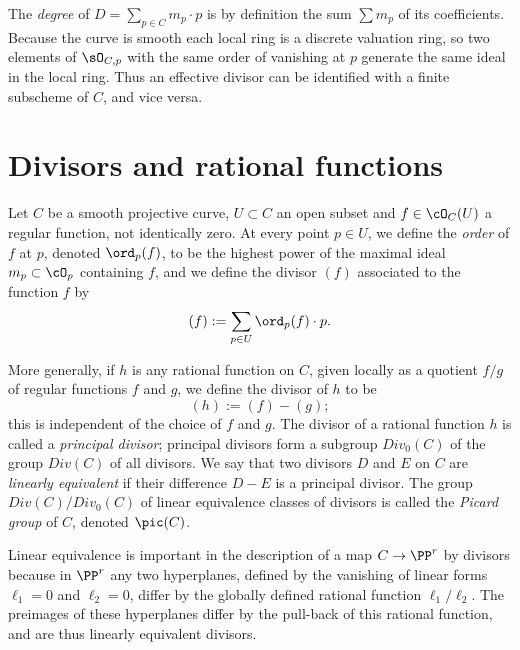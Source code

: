 
The \emph{degree} of  $D = \sum_{p\in C} m_p\cdot p$ is by definition the sum $\sum m_p$ of its coefficients. Because the curve is smooth each local ring is a discrete valuation ring, so two elements of
$\sO_{C,p}$ with the same order of vanishing at $p$ generate the same ideal in the local ring. Thus an effective divisor 
can be identified with a finite subscheme of $C$, and vice versa.

\section{Divisors and rational functions}

Let $C$ be a smooth projective curve, $U \subset C$ an open subset and $f \in \cO_C(U)$ a regular function, not identically zero. At every point $p \in U$, we define the \emph{order} of $f$ at $p$, denoted $\ord_p(f)$, to be the highest power of the maximal ideal $m_p \subset \cO_p$ containing $f$, and we define the divisor $(f)$ associated to the function $f$ by
$$
(f) := \sum_{p \in U} \ord_p(f) \cdot p.
$$

More generally, if $h$ is any rational function on $C$, given locally as a quotient $f/g$ of regular functions $f$ and $g$, we define the divisor of $h$ to be
$$
(h) := (f) - (g);
$$
this is independent of the choice of $f$ and $g$. The divisor of a rational function $h$ is called a \emph{principal divisor}; principal divisors form a subgroup $Div_0(C)$ of the group $Div(C)$ of all divisors. We say that two divisors $D$ and $E$ on $C$ are \emph{linearly equivalent} if their difference $D-E$ is a principal divisor. The group $Div(C)/Div_0(C)$ of linear equivalence classes of divisors is called the \emph{Picard group} of $C$, denoted $\pic(C)$. 

Linear equivalence is important in the description of a map $C\to \PP^{r}$ by divisors
because in $\PP^{r}$ any two hyperplanes, defined by the vanishing of linear forms  $\ell_{1}=0$ and $\ell_{2}=0$, differ by the globally defined rational
function $\ell_{1}/\ell_{2}$. The preimages of these hyperplanes differ by the pull-back of this rational function,
and are thus linearly equivalent divisors.



